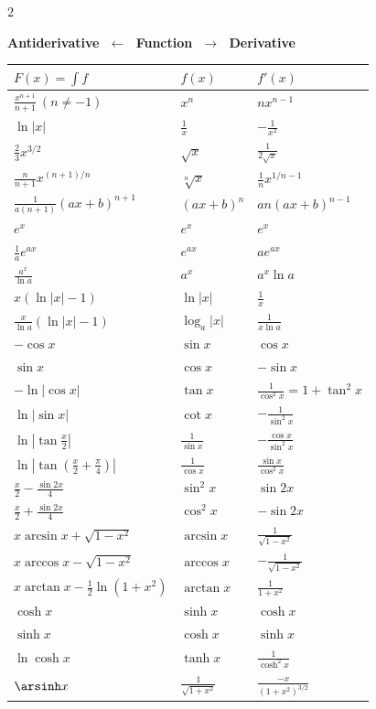 \begin{multicols}{2}
{\fontsize{6.2pt}{7.3pt}\selectfont
\renewcommand{\arraystretch}{1.12}
\begin{center}
\textbf{\sffamily\color{subText}Antiderivative $\;\leftarrow\;$ Function $\;\rightarrow\;$ Derivative}\\[1pt]
\begin{tabular}{@{}l|l|l@{}}
$F(x)=\int f$ & $f(x)$ & $f'(x)$\\
\midrule
$\frac{x^{n+1}}{n+1}\ (n\ne-1)$ & $x^n$ & $nx^{n-1}$\\
$\ln|x|$ & $\frac1x$ & $-\frac1{x^2}$\\
$\frac23x^{3/2}$ & $\sqrt x$ & $\frac1{2\sqrt x}$\\
$\frac{n}{n+1}x^{(n+1)/n}$ & $\sqrt[n]{x}$ & $\frac1nx^{1/n-1}$\\
$\frac{1}{a(n+1)}(ax+b)^{n+1}$ & $(ax+b)^n$ & $an(ax+b)^{n-1}$\\
\midrule
$e^x$ & $e^x$ & $e^x$\\
$\frac1ae^{ax}$ & $e^{ax}$ & $ae^{ax}$\\
$\frac{a^x}{\ln a}$ & $a^x$ & $a^x\ln a$\\
$x(\ln|x|-1)$ & $\ln|x|$ & $\frac1x$\\
$\frac{x}{\ln a}(\ln|x|-1)$ & $\log_a|x|$ & $\frac1{x\ln a}$\\
\midrule
$-\cos x$ & $\sin x$ & $\cos x$\\
$\sin x$ & $\cos x$ & $-\sin x$\\
$-\ln|\cos x|$ & $\tan x$ & $\frac1{\cos^2x}=1+\tan^2x$\\
$\ln|\sin x|$ & $\cot x$ & $-\frac1{\sin^2x}$\\
$\ln\left|\tan\frac x2\right|$ & $\frac1{\sin x}$ & $-\frac{\cos x}{\sin^2x}$\\
$\ln\left|\tan\left(\frac x2+\frac\pi4\right)\right|$ & $\frac1{\cos x}$ & $\frac{\sin x}{\cos^2 x}$\\
$\frac x2-\frac{\sin 2x}{4}$ & $\sin^2x$ & $\sin 2x$\\
$\frac x2+\frac{\sin 2x}{4}$ & $\cos^2x$ & $-\sin 2x$\\
\midrule
$x\arcsin x+\sqrt{1-x^2}$ & $\arcsin x$ & $\frac1{\sqrt{1-x^2}}$\\
$x\arccos x-\sqrt{1-x^2}$ & $\arccos x$ & $-\frac1{\sqrt{1-x^2}}$\\
$x\arctan x-\frac12\ln(1+x^2)$ & $\arctan x$ & $\frac1{1+x^2}$\\
\midrule
$\cosh x$ & $\sinh x$ & $\cosh x$\\
$\sinh x$ & $\cosh x$ & $\sinh x$\\
$\ln\cosh x$ & $\tanh x$ & $\frac1{\cosh^2x}$\\
$\arsinh x$ & $\frac1{\sqrt{1+x^2}}$ & $\frac{-x}{(1+x^2)^{3/2}}$\\
\end{tabular}
\end{center}
}


\end{multicols}
